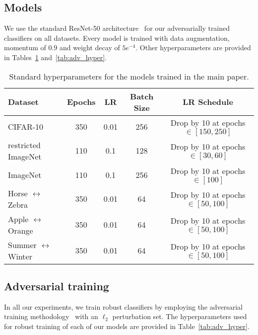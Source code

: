 \documentclass{article}
\newcommand{\HtoZ}{Horse $\leftrightarrow$ Zebra}
\newcommand{\StoW}{Summer $\leftrightarrow$ Winter}
\newcommand{\AtoO}{Apple $\leftrightarrow$ Orange}
\begin{document}
{\subsection{Models}
\label{sec:models}
We use the standard ResNet-50 architecture~\cite{he2016deep} for our 
adversarially trained classifiers on all datasets. Every model is trained with 
data augmentation, momentum of $0.9$ and weight decay of $5e^{-4}$.
Other hyperparameters are provided in Tables~\ref{tab:nat_hyper} 
and~\ref{tab:adv_hyper}. 

\begin{table}[!h]
	\caption{Standard hyperparameters for the models trained in the main paper.}
	\begin{center}
		\begin{tabular}{l|cccc}
			\toprule
			{\bf Dataset} & Epochs & LR & Batch Size & LR Schedule \\
			\midrule
			CIFAR-10 & 350 & 0.01 & 256 & Drop by 10 at epochs $\in [150, 250]$  \\
			restricted ImageNet & 110 & 0.1 & 128 & Drop by 10 at epochs $\in [30, 60]$  \\
			ImageNet & 110 &  0.1 & 256 &  Drop by 10 at epochs $\in [100]$   \\
			\HtoZ & 350 & 0.01 & 64 & Drop by 10 at epochs $\in [50, 100]$  \\
			\AtoO & 350 & 0.01 & 64 & Drop by 10 at epochs $\in [50, 100]$  \\
			\StoW & 350 & 0.01 & 64 & Drop by 10 at epochs $\in [50, 100]$  \\
			\bottomrule
		\end{tabular}
	\end{center}
	\label{tab:nat_hyper}
\end{table}



\subsection{Adversarial training}
In all our experiments, we train robust classifiers by employing the adversarial 
training methodology~\cite{madry2018towards} with an $\ell_2$ perturbation 
set. The hyperparameters used for robust training of each of our models
are provided in Table~\ref{tab:adv_hyper}.

}
\end{document}
